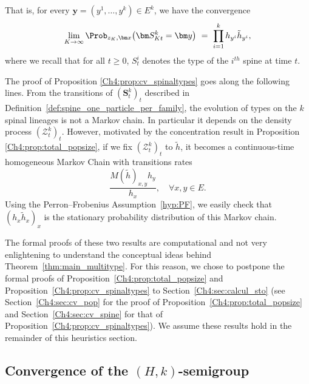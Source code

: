 \begin{refsegment}
\begin{prop}
That is, for every $\bm y = (y^1,\ldots, y^k)\in E^k$, we have the convergence
\begin{equation}\label{Ch4:eq:cv_types}
 \lim_{K\to\infty }\Prob_{z_K,\bm x}\big(\bm S^k_{Kt} =\bm y\big)\ =\ \prod_{i=1}^k h_{y^i}\tilde h_{y^i},
\end{equation}
where we recall that for all $t\geq 0$, $S^i_{t}$ denotes the type of the $i^{th}$ spine at time $t$.
\end{prop}


The proof of Proposition \ref{Ch4:prop:cv_spinaltypes} goes along the following lines. From the transitions of $(\bm S^k_t)_{t}$ described in Definition~\ref{def:spine_one_particle_per_family}, the evolution of types on the $k$ spinal lineages is not a Markov chain. In particular it depends on the density process $(\mathcal Z^k_t)_t$. However, motivated by the concentration result in Proposition \ref{Ch4:prop:total_popsize}, if we fix $(\mathcal Z^k_t)_t$ to $\tilde h$, it becomes a continuous-time homogeneous Markov Chain with transitions rates  
\begin{equation*}
 \frac{M(\tilde h)_{x,y}h_y}{h_x},\quad \forall  x, y\in E.
\end{equation*}
  Using the Perron--Frobenius Assumption~\ref{hyp:PF}, we easily check that $(h_x\tilde h_x)_x$ is the stationary probability distribution of this Markov chain.

  \medskip

  

The formal proofs of these two results are computational and not very enlightening to understand the conceptual ideas behind Theorem~\ref{thm:main_multitype}. For this reason, we chose to postpone the formal proofs of Proposition~\ref{Ch4:prop:total_popsize} and Proposition~\ref{Ch4:prop:cv_spinaltypes} to Section~\ref{Ch4:sec:calcul_sto} (see Section~\ref{Ch4:sec:cv_pop} for the proof of Proposition~\ref{Ch4:prop:total_popsize} and Section~\ref{Ch4:sec:cv_spine} for that of Proposition~\ref{Ch4:prop:cv_spinaltypes}). We assume these results hold in the remainder of this heuristics section.  
\subsection{Convergence of the $(H,k)$-semigroup}\label{Ch4:sec:heuristics_section_6}



\end{refsegment}
